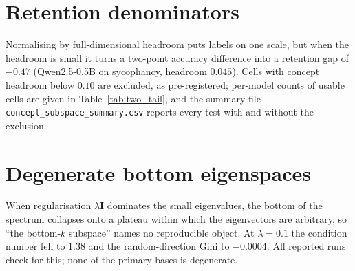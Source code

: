 \documentclass[11pt]{report}
\begin{document}
\section{Retention denominators}
Normalising by full-dimensional headroom puts labels on one scale, but when the
headroom is small it turns a two-point accuracy difference into a retention gap
of $-0.47$ (Qwen2.5-0.5B on sycophancy, headroom $0.045$). Cells with concept
headroom below $0.10$ are excluded, as pre-registered; per-model counts of
usable cells are given in Table~\ref{tab:two_tail}, and the summary file
\texttt{concept\_subspace\_summary.csv} reports every test with and without the
exclusion.

\section{Degenerate bottom eigenspaces}
When regularisation $\lambda\mathbf{I}$ dominates the small eigenvalues, the
bottom of the spectrum collapses onto a plateau within which the eigenvectors
are arbitrary, so ``the bottom-$k$ subspace'' names no reproducible object. At
$\lambda = 0.1$ the condition number fell to $1.38$ and the random-direction
Gini to $-0.0004$. All reported runs check for this; none of the primary bases
is degenerate.

\end{document}
